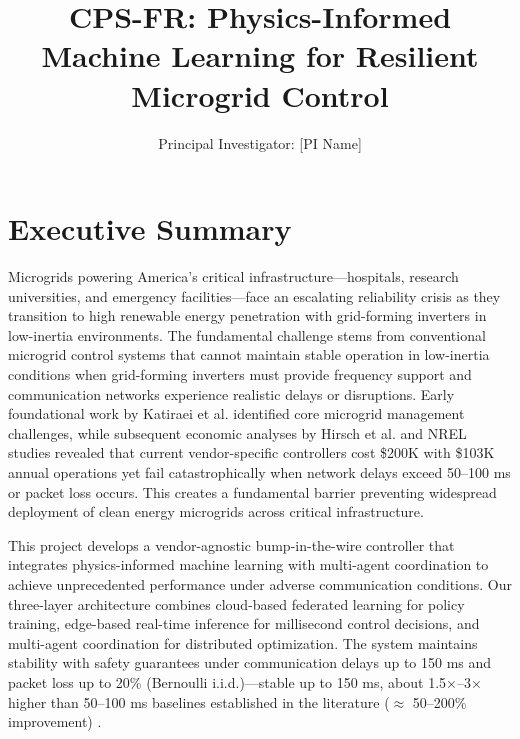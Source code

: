\documentclass[12pt]{article}
\begin{document}
\title{\Large\textbf{CPS-FR: Physics-Informed Machine Learning for Resilient Microgrid Control}}


\author{Principal Investigator: [PI Name]}

\date{}

\maketitle

\section{Executive Summary}

Microgrids powering America's critical infrastructure---hospitals, research universities, and emergency facilities---face an escalating reliability crisis as they transition to high renewable energy penetration with grid-forming inverters in low-inertia environments. The fundamental challenge stems from conventional microgrid control systems that cannot maintain stable operation in low-inertia conditions when grid-forming inverters must provide frequency support and communication networks experience realistic delays or disruptions. Early foundational work by Katiraei et al. \cite{katiraei2008} identified core microgrid management challenges, while subsequent economic analyses by Hirsch et al. \cite{hirsch2018} and NREL studies \cite{sigrin2019} revealed that current vendor-specific controllers cost \$200K with \$103K annual operations yet fail catastrophically when network delays exceed 50--100 ms or packet loss occurs. This creates a fundamental barrier preventing widespread deployment of clean energy microgrids across critical infrastructure.

This project develops a vendor-agnostic bump-in-the-wire controller that integrates physics-informed machine learning with multi-agent coordination to achieve unprecedented performance under adverse communication conditions. Our three-layer architecture combines cloud-based federated learning for policy training, edge-based real-time inference for millisecond control decisions, and multi-agent coordination for distributed optimization. The system maintains stability with safety guarantees under communication delays up to 150 ms and packet loss up to 20\% (Bernoulli i.i.d.)---stable up to 150 ms, about 1.5×--3× higher than 50--100 ms baselines established in the literature ($\approx$ 50--200\% improvement) \cite{bidram2014,simpson2013}.
\end{document}
